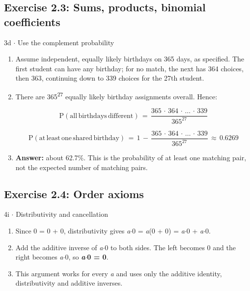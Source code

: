 \documentclass[11pt]{article}
\begin{document}
\begin{keepsection}\subsection{Exercise 2.3: Sums, products, binomial coefficients}

\begin{workedbox}{3d \ensuremath{\cdot} Use the complement probability}
\begin{enumerate}
\item Assume independent, equally likely birthdays on 365 days, as specified. The first student can have any birthday; for no match, the next has 364 choices, then 363, continuing down to 339 choices for the 27th student.
\item {}
There are 365\textsuperscript{27} equally likely birthday assignments overall. Hence:

\begin{equation*}\mathrm{P}(\text{all}\, \text{birthdays}\, \text{different})\, =\, \dfrac{365\, \cdot \, 364\, \cdot \, …\, \cdot \, 339}{365^{27}}\end{equation*}

\begin{equation*}\mathrm{P}(\text{at}\, \text{least}\, \text{one}\, \text{shared}\, \text{birthday})\, =\, 1\, -\, \dfrac{365\, \cdot \, 364\, \cdot \, …\, \cdot \, 339}{365^{27}}\, \approx \, 0.6269\end{equation*}
\item \textbf{Answer:} about 62.7\%. This is the probability of at least one matching pair, not the expected number of matching pairs.
\end{enumerate}
\end{workedbox}

\end{keepsection}
\begin{keepsection}\subsection{Exercise 2.4: Order axioms}

\begin{workedbox}{4i \ensuremath{\cdot} Distributivity and cancellation}
\begin{enumerate}
\item Since 0 = 0 + 0, distributivity gives \textit{a}\ensuremath{\cdot}0 = \textit{a}(0 + 0) = \textit{a}\ensuremath{\cdot}0 + \textit{a}\ensuremath{\cdot}0.
\item Add the additive inverse of \textit{a}\ensuremath{\cdot}0 to both sides. The left becomes 0 and the right becomes \textit{a}\ensuremath{\cdot}0, so \textbf{\textit{a}\ensuremath{\cdot}0 = 0}.
\item This argument works for every \textit{a} and uses only the additive identity, distributivity and additive inverses.
\end{enumerate}
\end{workedbox}

\end{keepsection}
\end{document}
